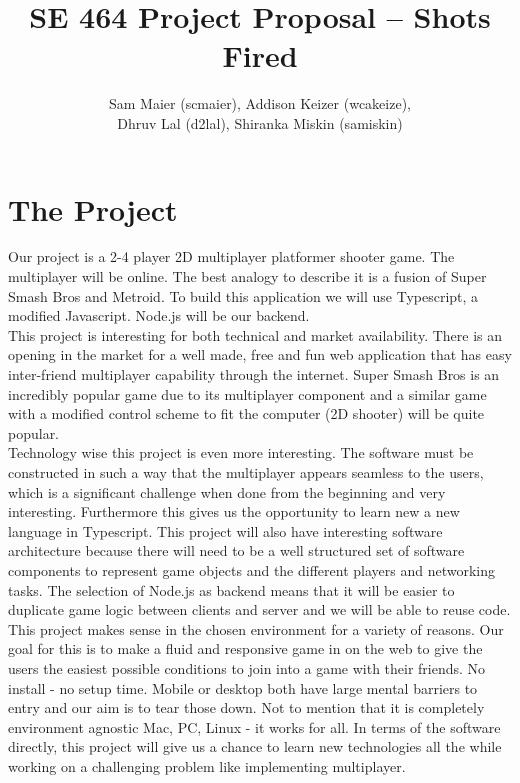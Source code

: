 \documentclass[11pt, oneside]{article}   	%
\title{SE 464 Project Proposal -- Shots Fired}
\author{Sam Maier (scmaier), Addison Keizer (wcakeize), \\Dhruv Lal (d2lal), Shiranka Miskin (samiskin)}
\begin{document}
\maketitle
\section{The Project}
\indent Our project is a 2-4 player 2D multiplayer platformer shooter game. The multiplayer will be online. The best analogy to describe it is a fusion of Super Smash Bros and Metroid. To build this application we will use Typescript, a modified Javascript. Node.js will be our backend. \\

This project is interesting for both technical and market availability. There is an opening in the market for a well made, free and fun web application that has easy inter-friend multiplayer capability through the internet. Super Smash Bros is an incredibly popular game due to its multiplayer component and a similar game with a modified control scheme to fit the computer (2D shooter) will be quite popular. \\

Technology wise this project is even more interesting. The software must be constructed in such a way that the multiplayer appears seamless to the users, which is a significant challenge when done from the beginning and very interesting. Furthermore this gives us the opportunity to learn new a new language in Typescript. This project will also have interesting software architecture because there will need to be a well structured set of software components to represent game objects and the different players and networking tasks. The selection of Node.js as backend means that it will be easier to duplicate game logic between clients and server and we will be able to reuse code. \\

This project makes sense in the chosen environment for a variety of reasons. Our goal for this is to make a fluid and responsive game in on the web to give the users the easiest possible conditions to join into a game with their friends. No install - no setup time. Mobile or desktop both have large mental barriers to entry and our aim is to tear those down. Not to mention that it is completely environment agnostic Mac, PC, Linux - it works for all. In terms of the software directly, this project will give us a chance to learn new technologies all the while working on a challenging problem like implementing multiplayer.  \\
\end{document}
